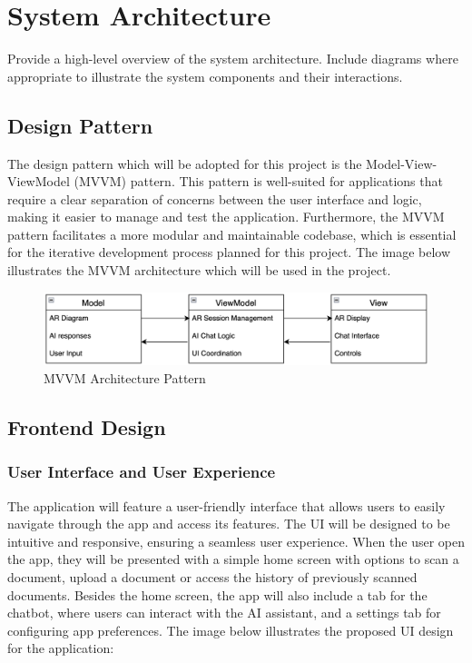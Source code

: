 \documentclass[10pt]{article}
\begin{document}
\section{System Architecture}
Provide a high-level overview of the system architecture. Include diagrams where appropriate to illustrate the system components and their interactions.

    \subsection{Design Pattern}

    The design pattern which will be adopted for this project is the Model-View-ViewModel (MVVM) pattern. This pattern is well-suited for applications that require a clear separation
    of concerns between the user interface and logic, making it easier to manage and test the application. Furthermore, the MVVM pattern facilitates a more modular and maintainable
    codebase, which is essential for the iterative development process planned for this project. The image below illustrates the MVVM architecture which will be used in the project.

    \begin{figure}[H]
        \centering
        \includegraphics[width=\textwidth]{img/Pattern.png}
        \caption{MVVM Architecture Pattern}
        \label{fig:Pattern}
    \end{figure}

    \subsection{Frontend Design}

    \subsubsection{User Interface and User Experience}

        The application will feature a user-friendly interface that allows users to easily navigate through the app and access its features. The UI will be designed to be intuitive and responsive, ensuring a seamless user experience. When the user open the app, they will be presented with
        a simple home screen with options to scan a document, upload a document or access the history of previously scanned documents. Besides the home screen, the app will also include a tab for the chatbot, where users can interact with the AI assistant, and a settings tab for configuring
        app preferences. The image below illustrates the proposed UI design for the application:
\end{document}
